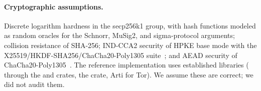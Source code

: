 \paragraph{Cryptographic assumptions.} Discrete logarithm hardness in the secp256k1 group, with hash functions modeled as random oracles for the Schnorr, MuSig2, and sigma-protocol arguments; collision resistance of SHA-256; IND-CCA2 security of HPKE base mode with the X25519/HKDF-SHA256/ChaCha20-Poly1305 suite~\citep{rfc9180}; and AEAD security of ChaCha20-Poly1305~\citep{rfc8439}. The reference implementation uses established libraries ( through the  and  crates, the  crate, Arti for Tor). We assume these are correct; we did not audit them.
